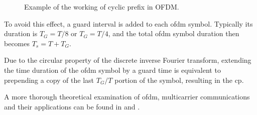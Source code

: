 \begin{figure}[H]
	\centering
	
	\vspace{0.5cm}
	
	\caption[]{Example of the working of cyclic prefix in OFDM.}
	\label{fig:OFDM_cyclic prefix}
\end{figure}

To avoid this effect, a guard interval is added to each \gls{ofdm} symbol. Typically its duration is $T_G = T/8$ or $T_G = T/4$, and the total \gls{ofdm} symbol duration then becomes $T_s = T + T_G$.

Due to the circular property of the discrete inverse Fourier transform, extending the time duration of the \gls{ofdm} symbol by a guard time is equivalent to prepending a copy of the last $T_G/T$ portion of the symbol, resulting in the \gls{cp}.


A more thorough theoretical examination of \gls{ofdm}, multicarrier communications and their applications can be found in \cite{OFDMWireless} and \cite{Proakis_2001}.


